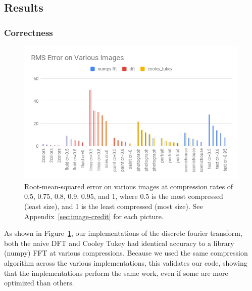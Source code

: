 \subsection{Results}
		\subsubsection{Correctness}
		\begin{figure}[h]
			\vspace{-5mm}
			\includegraphics[width=\linewidth]{images/accuracy.png}
			\caption{Root-mean-squared error on various images at compression rates of 0.5, 0.75, 0.8, 0.9, 0.95, and 1, where 0.5 is the most compressed (least size), and 1 is the least compressed (most size). See Appendix~\ref{sec:image-credit} for each picture.}
			\label{fig:accuracy}
		\end{figure}

		As shown in Figure~\ref{fig:accuracy}, our implementations of the discrete fourier transform, both the naive DFT and Cooley Tukey had identical accuracy to a library (numpy) FFT at various compressions. Because we used the same compression algorithm across the various implementations, this validates our code, showing that the implementations perform the same work, even if some are more optimized than others.

